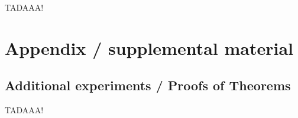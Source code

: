 \documentclass{article}
\begin{document}
TADAAA!







\newpage
\appendix
\section{Appendix / supplemental material}\label{app}

\subsection{Additional experiments / Proofs of Theorems}\label{app:exp}

TADAAA!
\end{document}
